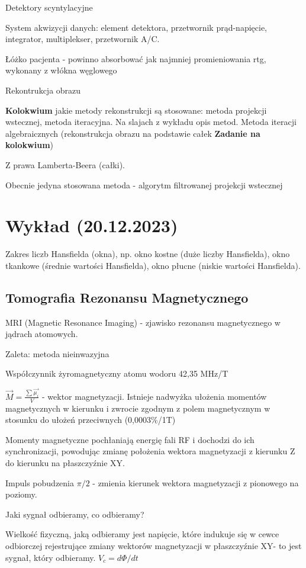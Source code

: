 \documentclass{article}
\begin{document}
Detektory scyntylacyjne

System akwizycji danych: element detektora, przetwornik prąd-napięcie, integrator, multiplekser, przetwornik A\slash C.

Łóżko pacjenta - powinno absorbować jak najmniej promieniowania rtg, wykonany z włókna węglowego

Rekontrukcja obrazu

\textbf{Kolokwium} jakie metody rekonstrukcji są stosowane: metoda projekcji wstecznej, metoda iteracyjna. Na slajach z wykładu opis metod. Metoda iteracji algebraicznych (rekonstrukcja obrazu na podstawie całek \textbf{Zadanie na kolokwium})

Z prawa Lamberta-Beera (całki).

Obecnie jedyna stosowana metoda - algorytm filtrowanej projekcji wstecznej

\section{Wykład (20.12.2023)}

Zakres liczb Hansfielda (okna), np. okno kostne (duże liczby Hansfielda), okno tkankowe (średnie wartości Hansfielda), okno płucne (niskie wartości Hansfielda).

\subsection{Tomografia Rezonansu Magnetycznego}

MRI (Magnetic Resonance Imaging) - zjawisko rezonansu magnetycznego w jądrach atomowych.

Zaleta: metoda nieinwazyjna

Współczynnik żyromagnetyczny atomu wodoru 42,35 MHz\slash T

$\vec{M} = \frac{\sum_{}^{} \vec{\mu_i}}{V}$ - wektor magnetyzacji. Istnieje nadwyżka ułożenia momentów magnetycznych w kierunku i zwrocie zgodnym z polem magnetycznym w stosunku do ułożeń przeciwnych (0,0003\%\slash 1T)

Momenty magnetyczne pochłaniają energię fali RF i dochodzi do ich synchronizacji, powodując zmianę położenia wektora magnetyzacji z kierunku Z do kierunku na płaszczyźnie XY.

Impuls pobudzenia $\pi/2$ - zmienia kierunek wektora magnetyzacji z pionowego na poziomy.

Jaki sygnał odbieramy, co odbieramy?

Wielkość fizyczną, jaką odbieramy jest napięcie, które indukuje się w cewce odbiorczej  rejestrujące zmiany wektorów magnetyzacji w płaszczyźnie XY- to jest sygnał, który odbieramy. $V_c = d\Phi / dt$
\end{document}
